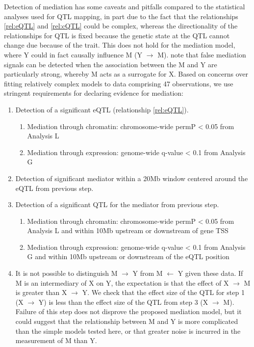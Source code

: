 \documentclass[9pt,twocolumn,twoside]{gsajnl}
\begin{document}
Detection of mediation has some caveats and pitfalls compared to the statistical analyses used for QTL mapping, in part due to the fact that the relationships \ref{rel:eQTL} and \ref{rel:cQTL} could be complex, whereas the directionality of the relationships for QTL is fixed because the genetic state at the QTL cannot change due because of the trait. This does not hold for the mediation model, where Y could in fact causally influence M (Y $\rightarrow$ M). \cite{Didelez2007} note that false mediation signals can be detected when the association between the M and Y are particularly strong, whereby M acts as a surrogate for X. Based on concerns over fitting relatively complex models to data comprising 47 observations, we use stringent requirements for declaring evidence for mediation:
\begin{enumerate}
	\item Detection of a significant eQTL (relationship \ref{rel:eQTL}).
    \begin{enumerate}
    	\item Mediation through chromatin: chromosome-wide permP < 0.05 from Analysis L
        \item Mediation through expression: genome-wide q-value < 0.1 from Analysis G
    \end{enumerate}
    \item Detection of significant mediator within a 20Mb window centered around the eQTL from previous step.
    \item Detection of a significant QTL for the mediator from previous step.
    \begin{enumerate}
    	\item Mediation through chromatin: chromosome-wide permP < 0.05 from Analysis L and within 10Mb upstream or downstream of gene TSS
        \item Mediation through expression: genome-wide q-value < 0.1 from Analysis G and within 10Mb upstream or downstream of the eQTL position
    \end{enumerate}
    \item It is not possible to distinguish M $\rightarrow$ Y from M $\leftarrow$ Y given these data. If M is an intermediary of X on Y, the expectation is that the effect of X $\rightarrow$ M is greater than X $\rightarrow$ Y. We check that the effect size of the QTL for step 1 (X $\rightarrow$ Y) is less than the effect size of the QTL from step 3 (X $\rightarrow$ M). Failure of this step does not disprove the proposed mediation model, but it could suggest that the relationship between M and Y is more complicated than the simple models tested here, or that greater noise is incurred in the measurement of M than Y.
\end{enumerate}
\end{document}
